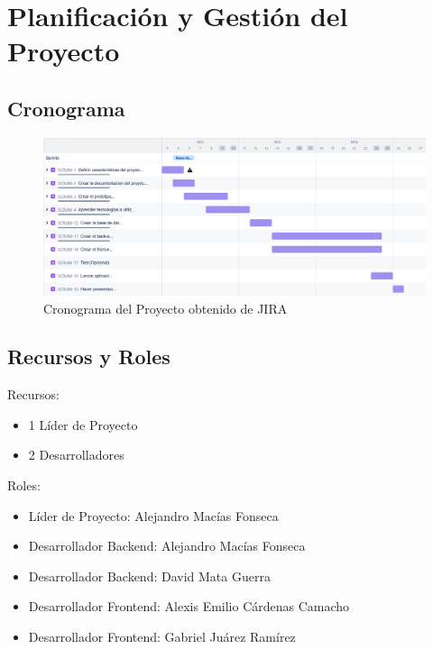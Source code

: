 	\chapter{Planificación y Gestión del Proyecto}
	\section{Cronograma}
	\begin{figure}[h]
		\centering
		\includegraphics[width=1\linewidth]{./images/proyecto_final_ingr_2024-11-05_11.32am}
		\caption{Cronograma del Proyecto obtenido de JIRA}
	\end{figure}
	
	\section{Recursos y Roles}
	Recursos:
	\begin{itemize}
		\item 1 Líder de Proyecto
		\item 2 Desarrolladores
	\end{itemize}

	Roles: 
	\begin{itemize}
		\item Líder de Proyecto: Alejandro Macías Fonseca
		\item Desarrollador Backend: Alejandro Macías Fonseca
		\item Desarrollador Backend: David Mata Guerra
		\item Desarrollador Frontend: Alexis Emilio Cárdenas Camacho
		\item Desarrollador Frontend: Gabriel Juárez Ramírez
	\end{itemize}
	
